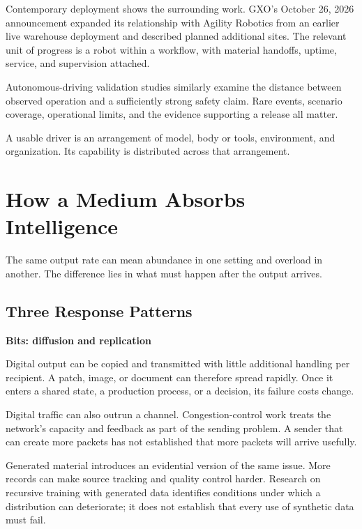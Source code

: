 \documentclass[11pt,openany]{book}
\newcommand{\subhead}[1]{\par\medskip\noindent\textbf{#1}\par\nobreak\smallskip}
\begin{document}
Contemporary deployment shows the surrounding work. GXO's October 26, 2026 announcement expanded its relationship with Agility Robotics from an earlier live warehouse deployment and described planned additional sites.\cite{gxo2026digit} The relevant unit of progress is a robot within a workflow, with material handoffs, uptime, service, and supervision attached.

Autonomous-driving validation studies similarly examine the distance between observed operation and a sufficiently strong safety claim.\cite{kalra2016,koopman2016} Rare events, scenario coverage, operational limits, and the evidence supporting a release all matter.

A usable driver is an arrangement of model, body or tools, environment, and organization. Its capability is distributed across that arrangement.

\section{How a Medium Absorbs Intelligence}

The same output rate can mean abundance in one setting and overload in another. The difference lies in what must happen after the output arrives.

\subsection{Three Response Patterns}

\subhead{Bits: diffusion and replication}

Digital output can be copied and transmitted with little additional handling per recipient. A patch, image, or document can therefore spread rapidly. Once it enters a shared state, a production process, or a decision, its failure costs change.

Digital traffic can also outrun a channel. Congestion-control work treats the network's capacity and feedback as part of the sending problem.\cite{jacobson1988} A sender that can create more packets has not established that more packets will arrive usefully.

Generated material introduces an evidential version of the same issue. More records can make source tracking and quality control harder. Research on recursive training with generated data identifies conditions under which a distribution can deteriorate; it does not establish that every use of synthetic data must fail.\cite{shumailov2024ai}
\end{document}
